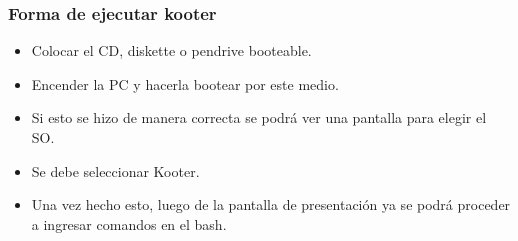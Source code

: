 \documentclass[a4paper,11pt]{article}
\begin{document}
\subsubsection{Forma de ejecutar kooter}
\begin{itemize}
	\item Colocar el CD, diskette o pendrive booteable.
	\item Encender la PC y hacerla bootear por este medio.
	\item Si esto se hizo de manera correcta se podrá ver una pantalla para elegir el SO.
	\item Se debe seleccionar Kooter.
	\item Una vez hecho esto, luego de la pantalla de presentación ya se podrá proceder a ingresar comandos en el bash.
\end{itemize}
\end{document}
